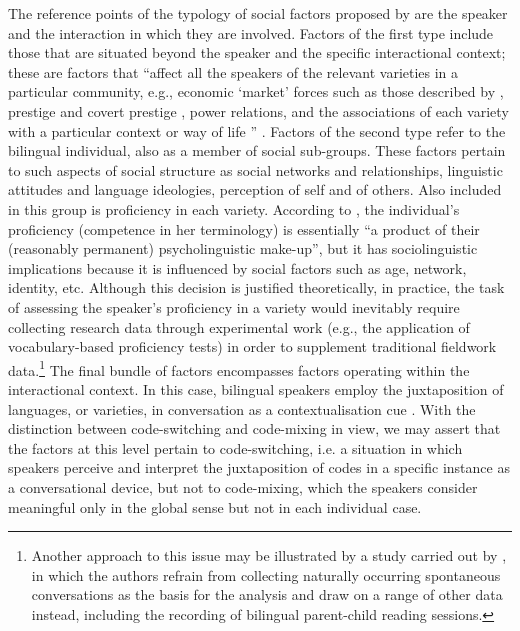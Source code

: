 The reference points of the typology of social factors proposed by \citet[][42--43]{gardner-chloros_code-switching_2009} are the speaker and the interaction in which they are involved. Factors of the first type include those that are situated beyond the speaker and the specific interactional context; these are factors that ``affect all the speakers of the relevant varieties in a particular community, e.g., economic `market' forces such as those described by \citet{bourdieu-91}, prestige and covert prestige \citep{labov-72,trudgill-74}, power relations, and the  associations of each variety with a particular context or way of life \citep{gal-79}'' \citet[][42]{gardner-chloros_code-switching_2009}. Factors of the second type refer to the bilingual individual, also as a member of social sub-groups. These factors pertain to such aspects of social structure as social networks and relationships, linguistic attitudes and language ideologies, perception of self and of  others. Also included in this group is proficiency in each variety. According to \citet[][43]{gardner-chloros_code-switching_2009}, the individual's proficiency (competence in her terminology) is essentially ``a product of their (reasonably permanent) psycholinguistic make-up'', but it has sociolinguistic implications because it is influenced by social factors such as age, network, identity, etc. Although this decision is justified theoretically, in practice, the task of assessing the speaker's proficiency in a variety would inevitably require collecting research data through experimental work (e.g., the application of vocabulary-based proficiency tests) in order to supplement traditional fieldwork data.\footnote{Another approach to this issue may be illustrated by a study carried out by  \citet{muysken-etal96}, in which the authors refrain from collecting naturally occurring spontaneous conversations as the basis for the analysis and draw on a range of other data instead, including the recording of bilingual parent-child reading sessions.} The final bundle of factors encompasses factors operating within the interactional context. In this case, bilingual speakers employ the juxtaposition of languages, or varieties, in conversation as a contextualisation cue \citep[see e.g., the papers in][]{auer-98}. With the distinction between code-switching and code-mixing in view, we may assert that the factors at this level pertain to code-switching, i.e. a situation in which speakers perceive and interpret the juxtaposition of codes in a specific instance as a conversational device, but not to code-mixing, which the speakers consider meaningful only in the global sense but not in each individual case. 

